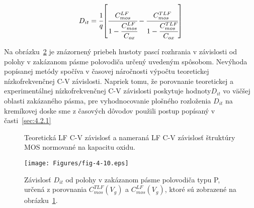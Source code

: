 \begin{equation}\label{eq:4.18}
  D_{it} = {\cfrac{1}{q}} {\left[\cfrac{C_{mos}^{LF}}{1-\cfrac{C_{mos}^{LF}}{C_{ox}}}-\cfrac{C_{mos}^{TLF}}{1-\cfrac{C_{mos}^{TLF}}{C_{ox}}}\right]}
\end{equation}

Na obrázku~\ref{fig:4.10} je znázornený priebeh hustoty pascí
rozhrania v závislosti od polohy v zakázanom pásme polovodiča určený
uvedeným spôsobom.  Nevýhoda popísanej metódy spočíva v časovej
náročnosti výpočtu teoretickej nízkofrekvenčnej C-V
závislosti. Napriek tomu, že porovnanie teoretickej a experimentálnej
nízkofrekvenčnej C-V závislosti poskytuje hodnoty$D_{it}$ vo väčšej
oblasti zakázaného pásma, pre vyhodnocovanie plošného rozloženia
$D_{it}$ na kremíkovej doske sme z časových dôvodov použili postup
popísaný v časti~\ref{sec:4.2.1}

\begin{figure}[h!]\centering
  \begin{minipage}[c]{\myfiguresize}
    \begin{center}
      
      \caption[Teoretická LF C-V závislosť a nameraná LF C-V
        závislosť]{Teoretická LF C-V závislosť a nameraná LF C-V
        závislosť štruktúry MOS normované na kapacitu
        oxidu.}\label{fig:4.9}
    \end{center}
  \end{minipage}
\end{figure}

\begin{figure}[h!]\centering
  \begin{minipage}[c]{\myfiguresize}
    \begin{center}
      \texttt{[image: Figures/fig-4-10.eps]}
      \caption[Závislosť $D_{it}$ od polohy v zakázanom pásme
        polovodiča určená z porovnania $C_{mos}^{TLF}(V_{g})$ a
        $C_{mos}^{LF}(V_{g})$]{Závislosť $D_{it}$ od polohy v
        zakázanom pásme polovodiča typu P, určená z porovnania
        $C_{mos}^{TLF}(V_{g})$ a $C_{mos}^{LF}(V_{g})$, ktoré sú
        zobrazené na obrázku~\ref{fig:4.9}.}\label{fig:4.10}
    \end{center}
  \end{minipage}
\end{figure}


